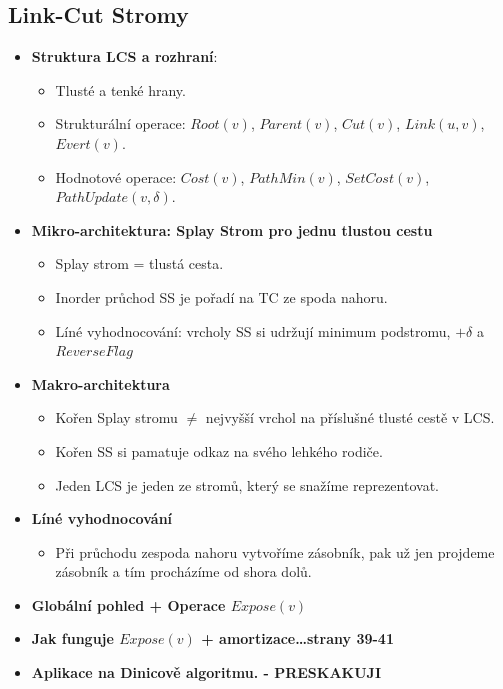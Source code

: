 \documentclass[11pt,a4paper]{article}
\begin{document}
    \subsection{Link-Cut Stromy}
    \begin{itemize}
    \item \textbf{Struktura LCS a rozhraní}:
    \begin{itemize}
        \item Tlusté a tenké hrany.
        \item Strukturální operace: $Root(v)$, $Parent(v)$, $Cut(v)$, $Link(u, v)$, $Evert(v)$.
        \item Hodnotové operace: $Cost(v)$, $PathMin(v)$, $SetCost(v)$, $PathUpdate(v, \delta)$.
    \end{itemize}
    \item \textbf{Mikro-architektura: Splay Strom pro jednu tlustou cestu}
        \begin{itemize}
            \item Splay strom = tlustá cesta.
            \item Inorder průchod SS je pořadí na TC ze spoda nahoru.
            \item Líné vyhodnocování: vrcholy SS si udržují minimum podstromu, $+\delta$ a $ReverseFlag$
        \end{itemize}
    \item \textbf{Makro-architektura}
    \begin{itemize}
        \item Kořen Splay stromu $\neq$ nejvyšší vrchol na příslušné tlusté cestě v LCS.
        \item Kořen SS si pamatuje odkaz na svého lehkého rodiče.
        \item Jeden LCS je jeden ze stromů, který se snažíme reprezentovat.
    \end{itemize}
    \item \textbf{Líné vyhodnocování}
    \begin{itemize}
        \item Při průchodu zespoda nahoru vytvoříme zásobník, pak už jen projdeme zásobník a tím procházíme od shora dolů.
    \end{itemize}
    \item \textbf{Globální pohled + Operace $Expose(v)$}
    \item \textbf{Jak funguje $Expose(v)$ + amortizace\dots strany 39-41}
    \item \textbf{Aplikace na Dinicově algoritmu. - PRESKAKUJI}
    \end{itemize}
\end{document}
